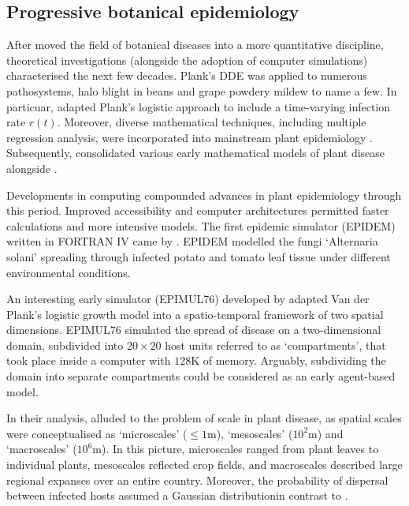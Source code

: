 \subsection{Progressive botanical epidemiology}
\label{sec:prog-epi}
After \cite{van2013plant} moved the field of botanical diseases into a more quantitative discipline,
theoretical investigations (alongside the adoption of computer simulations) characterised the next few decades.
Plank's DDE was applied to numerous pathosystems, halo blight in beans \cite{doi:10.1111/j.1744-7348.1979.tb06527.x} 
and grape powdery mildew \cite{sall1980epidemiology} to name a few. In particuar, \cite{sall1980epidemiology} adapted Plank's
logistic approach to include a time-varying infection rate $r(t)$. Moreover, diverse mathematical techniques, 
including multiple  regression analysis, were incorporated into mainstream plant epidemiology \cite{butt1974multiple}. 
Subsequently, \cite{zadoks1979epidemiology} consolidated various early mathematical models of plant disease 
alongside \cite{jeger1984use}.

Developments in computing compounded advances in plant epidemiology through this period. 
Improved accessibility and computer architectures permitted faster calculations and more intensive models. 
The first epidemic simulator (EPIDEM) written in FORTRAN IV came by \cite{waggoner1969epidem}. 
EPIDEM modelled the fungi `Alternaria solani' spreading through infected potato and tomato leaf tissue under different environmental conditions. 
    
An interesting early simulator (EPIMUL76) developed by \cite{zadoks1977role} adapted Van der Plank's logistic growth model into a spatio-temporal framework of two spatial dimensions. 
EPIMUL76 simulated the spread of disease on a two-dimensional domain, subdivided into $20\times 20$ host units referred to as `compartments', that took place inside a computer with $128\mathrm{K}$ of memory.
Arguably, subdividing the domain into separate compartments could be considered as an early agent-based model. 

In their analysis, \cite{zadoks1977role} alluded to the problem of scale in plant disease, as spatial scales
were conceptualised as `microscales' ($\leq 1\mathrm{m}$), `mesoscales' ($10^2\mathrm{m}$) and `macroscales' ($10^6\mathrm{m}$).
In this picture, microscales ranged from plant leaves to individual plants, mesoscales reflected crop fields, and macroscales
described large regional expanses over an entire country. Moreover, the probability of dispersal between infected hosts assumed a
Gaussian distribution\textemdash in contrast to \cite{doi:10.1146/annurev.py.06.090168.001201}.

